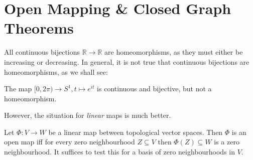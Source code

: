 \documentclass[twoside,symmetric, openany, 12pt]{./tuftebook}
\theoremstyle{definition}
\theoremstyle{definition}
\theoremstyle{definition}
\newcommand{\R}{\mathbb{R}}
\begin{document}
\section{Open Mapping \& Closed Graph Theorems}
All continuous bijections $\R \to \R$ are homeomorphisms, as they must either be increasing or decreasing. In general, it is not true that continuous bijections are homeomorphisms, as we shall see:
\begin{Example}
	The map $[0,2\pi)\to S^1, t\mapsto e^{it}$ is continuous and bijective, but not a homeomorphism.
\end{Example}
However, the situation for \emph{linear} maps is much better.
\begin{Theorem}
	Let $\Phi:V\to W$ be a linear map between topological vector spaces. Then $\Phi$ is an open map iff for every zero neighbourhood $Z\subseteq V$ then $\Phi(Z)\subseteq W$ is a zero neighbourhood. It suffices to test this for a basis of zero neighbourhoods in $V$.
\end{Theorem}
\end{document}
